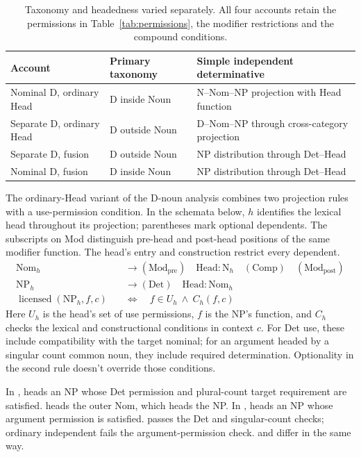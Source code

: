 \documentclass[12pt]{article}
\begin{document}
\begin{table}[H]
\centering\small
\caption{Taxonomy and headedness varied separately. All four accounts retain the permissions in Table~\ref{tab:permissions}, the modifier restrictions and the compound conditions.}\label{tab:economy}
\begin{tabular}{>{\raggedright\arraybackslash}p{3.1cm}>{\raggedright\arraybackslash}p{3.9cm}>{\raggedright\arraybackslash}p{4.7cm}}
\toprule
Account & Primary taxonomy & Simple independent determinative \\
\midrule
Nominal D, ordinary Head & D inside Noun & N--Nom--NP projection with Head function \\
Separate D, ordinary Head & D outside Noun & D--Nom--NP through cross-category projection \\
Separate D, fusion & D outside Noun & NP distribution through Det--Head \\
Nominal D, fusion & D inside Noun & NP distribution through Det--Head \\
\bottomrule
\end{tabular}
\end{table}

The ordinary-Head variant of the D-noun analysis combines two projection rules with a use-permission condition. In the schemata below, $h$ identifies the lexical head throughout its projection; parentheses mark optional dependents. The subscripts on Mod distinguish pre-head and post-head positions of the same modifier function. The head's entry and construction restrict every dependent.
\[
\begin{aligned}
\mathrm{Nom}_{h} &\to (\mathrm{Mod}_{\mathrm{pre}})\quad \mathrm{Head}:\mathrm{N}_{h}\quad (\mathrm{Comp})\quad (\mathrm{Mod}_{\mathrm{post}}) \\
\mathrm{NP}_{h} &\to (\mathrm{Det})\quad \mathrm{Head}:\mathrm{Nom}_{h} \\
\operatorname{licensed}(\mathrm{NP}_{h},f,c)\quad &\Longleftrightarrow\quad f\in U_h\ \land\ C_h(f,c)
\end{aligned}
\]
Here $U_h$ is the head's set of use permissions, $f$ is the NP's function, and $C_h$ checks the lexical and constructional conditions in context $c$. For Det use, these include compatibility with the target nominal; for an argument headed by a singular count common noun, they include required determination. Optionality in the second rule doesn't override those conditions.

In ,  heads an NP whose Det permission and plural-count target requirement are satisfied.  heads the outer Nom, which heads the NP. In ,  heads an NP whose argument permission is satisfied.  passes the Det and singular-count checks; ordinary independent  fails the argument-permission check.  and  differ in the same way.
\end{document}
